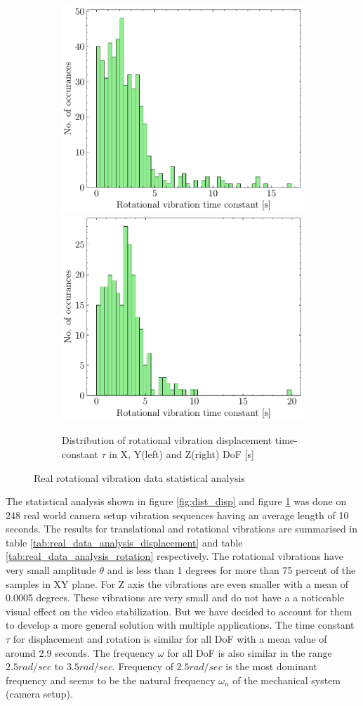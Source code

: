 \begin{figure}[H]
    \begin{subfigure}{\linewidth}
    \includegraphics[width=.5\linewidth]{images/fig_chapter4/data_dist/11.pdf}\hfill
    \includegraphics[width=.5\linewidth]{images/fig_chapter4/data_dist/12.pdf}
    \caption{Distribution of rotational vibration displacement time-constant $ \tau $ in X, Y(left) and Z(right) DoF [s]}
    \end{subfigure}

\caption{Real rotational vibration data statistical analysis}
\label{fig:dist_rot}
\end{figure}


The statistical analysis shown in figure \ref{fig:dist_disp} and figure \ref{fig:dist_rot} was done on 248 real world camera setup vibration sequences having an average length of 10 seconds. The results for translational and rotational vibrations are summarised in table \ref{tab:real_data_analysis_displacement} and table \ref{tab:real_data_analysis_rotation} respectively. The rotational vibrations have very small amplitude $ \theta $ and is less than 1 degrees for more than 75 percent of the samples in XY plane. For Z axis the vibrations are even smaller with a mean of 0.0005 degrees. These vibrations are very small and do not have a a noticeable visual effect on the video stabilization. But we have decided to account for them to develop a more general solution with multiple applications. The time constant $ \tau $ for displacement and rotation is similar for all DoF with a mean value of around 2.9 seconds.  The frequency $ \omega $ for all DoF is also similar in the range $ 2.5 rad/sec $ to $ 3.5 rad/sec $. Frequency of $ 2.5 rad/sec $ is the most dominant frequency and seems to be the natural frequency $ \omega_n $ of the mechanical system (camera setup).


